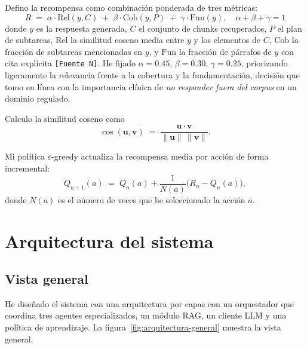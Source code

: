 \documentclass[11pt,a4paper]{article}
\begin{document}
Defino la recompensa como combinación ponderada de tres métricas:
\begin{equation}
  R \;=\; \alpha \cdot \mathrm{Rel}(y, C) \;+\; \beta \cdot \mathrm{Cob}(y, P) \;+\; \gamma \cdot \mathrm{Fun}(y),
  \quad \alpha + \beta + \gamma = 1
\end{equation}
donde $y$ es la respuesta generada, $C$ el conjunto de chunks recuperados, $P$ el plan de subtareas, $\mathrm{Rel}$ la similitud coseno media entre $y$ y los elementos de $C$, $\mathrm{Cob}$ la fracción de subtareas mencionadas en $y$, y $\mathrm{Fun}$ la fracción de párrafos de $y$ con cita explícita \texttt{[Fuente~N]}. He fijado $\alpha = 0.45$, $\beta = 0.30$, $\gamma = 0.25$, priorizando ligeramente la relevancia frente a la cobertura y la fundamentación, decisión que tomo en línea con la importancia clínica de \emph{no responder fuera del corpus} en un dominio regulado.

Calculo la similitud coseno como
\begin{equation}
  \cos(\mathbf{u}, \mathbf{v}) \;=\; \frac{\mathbf{u} \cdot \mathbf{v}}{\|\mathbf{u}\| \, \|\mathbf{v}\|}.
\end{equation}

Mi política $\varepsilon$-greedy actualiza la recompensa media por acción de forma incremental:
\begin{equation}
  Q_{n+1}(a) \;=\; Q_n(a) + \frac{1}{N(a)}\bigl(R_n - Q_n(a)\bigr),
\end{equation}
donde $N(a)$ es el número de veces que he seleccionado la acción $a$.

\section{Arquitectura del sistema}\label{sec:arquitectura}

\subsection{Vista general}

He diseñado el sistema con una arquitectura por capas con un orquestador que coordina tres agentes especializados, un módulo RAG, un cliente LLM y una política de aprendizaje. La figura~\ref{fig:arquitectura-general} muestra la vista general.
\end{document}
